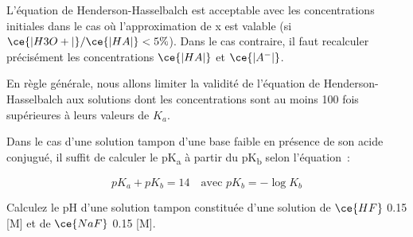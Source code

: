 \documentclass[
  11pt,
  a4paper,
  openany]{book}
\begin{document}
L'équation de Henderson-Hasselbalch est acceptable avec les concentrations initiales dans le cas où l'approximation de x est valable (si \(\ce{|H3O+|}/\ce{|HA|} < 5\%\)). Dans le cas contraire, il faut recalculer précisément les concentrations \(\ce{|HA|}\) et \(\ce{|A^-|}\).

En règle générale, nous allons limiter la validité de l'équation de Henderson-Hasselbalch aux solutions dont les concentrations sont au moins 100 fois supérieures à leurs valeurs de \(K_a\).

Dans le cas d'une solution tampon d'une base faible en présence de son acide conjugué, il suffit de calculer le pK\textsubscript{a} à partir du pK\textsubscript{b} selon l'équation~:

\[
pK_a + pK_b = 14 \quad \text{avec } pK_b = - \log K_b
\]

\begin{Exercise}
Calculez le pH d'une solution tampon constituée d'une solution de \(\ce{HF}\) 0.15 {[}M{]} et de \(\ce{NaF}\) 0.15 {[}M{]}.

\end{Exercise}
\end{document}
